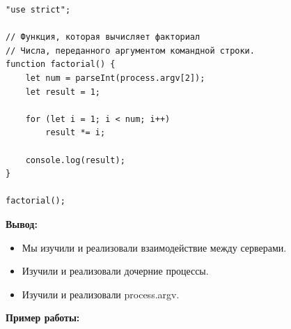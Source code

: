 \begin{lstlisting}[caption=Код программы. TASK\_2. Задание 2. Дочерний процесс.]
"use strict";

// Функция, которая вычисляет факториал
// Числа, переданного аргументом командной строки.
function factorial() {
	let num = parseInt(process.argv[2]);
	let result = 1;

	for (let i = 1; i < num; i++)
		result *= i;

	console.log(result);
}

factorial();
\end{lstlisting}

\textbf{Вывод:}

\begin{itemize} 
	\item Мы изучили и реализовали взаимодействие между серверами.
	\item Изучили и реализовали дочерние процессы.
	\item Изучили и реализовали process.argv.
\end{itemize}


\textbf{Пример работы:}

\begin{figure}[ht!]
\end{figure}


\begin{figure}[ht!]
\end{figure}


